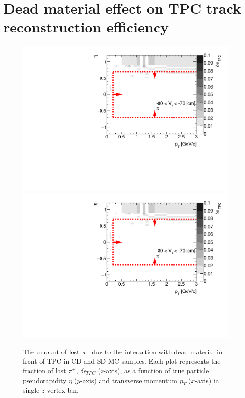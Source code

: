 
\chapter{Dead material effect on TPC track reconstruction efficiency}\label{appendix:deadMaterial}
\begin{figure}[hb]
	\caption[The amount of lost $\pi^+$ due to the interaction with dead material in front of TPC as a function of $p_T$, $\eta$ and $z$-vertex in CD and SD]{The amount of lost $\pi^-$ due to the interaction with dead material in front of TPC in CD and SD MC samples. Each plot represents the fraction of lost $\pi^+$, $\delta\epsilon_{ TPC}$ ($z$-axis), as a function of true particle pseudorapidity $\eta$ ($y$-axis) and transverse momentum $p_{T}$ ($x$-axis) in single $z$-vertex bin.}\label{fig:dead_materialSDCD3Dpip}
	\centering
	\parbox{0.325\textwidth}{
		\centering
		\includegraphics[width=\linewidth,page=49]{graphics/systematicsEfficiency/deadMaterial/secondaries_Unbinned_SDCD_.pdf}\\
		\includegraphics[width=\linewidth,page=52]{graphics/systematicsEfficiency/deadMaterial/secondaries_Unbinned_SDCD_.pdf}\\
}
\end{figure}
